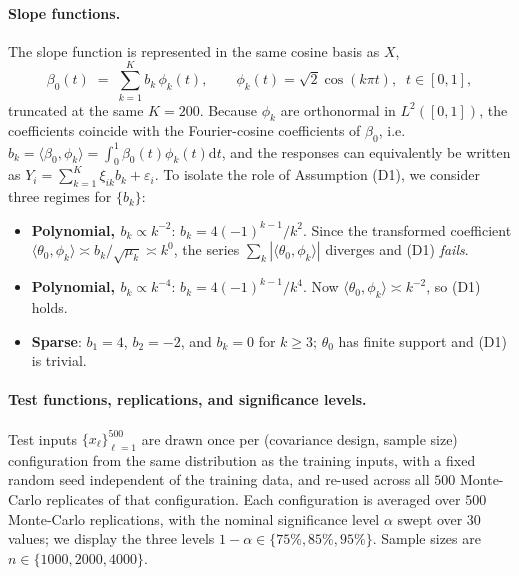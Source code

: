 \documentclass[11pt,a4paper]{article}
\theoremstyle{definition}
\theoremstyle{plain}
\theoremstyle{remark}
\newcommand{\ud}{\mathrm d}
\begin{document}
\paragraph{Slope functions.}
The slope function is represented in the same cosine basis as $X$,
\[
\beta_0(t)\;=\;\sum_{k=1}^{K} b_k\,\phi_k(t),\qquad \phi_k(t)=\sqrt 2\cos(k\pi t),\;\; t\in[0,1],
\]
truncated at the same $K=200$. Because $\phi_k$ are orthonormal in $L^2([0,1])$, the coefficients coincide with the Fourier-cosine coefficients of $\beta_0$, i.e.\ $b_k=\langle\beta_0,\phi_k\rangle=\int_0^1\beta_0(t)\phi_k(t)\ud t$, and the responses can equivalently be written as $Y_i=\sum_{k=1}^{K}\xi_{ik}b_k+\varepsilon_i$. To isolate the role of Assumption (D1), we consider three regimes for $\{b_k\}$:
\begin{itemize}
\item \textbf{Polynomial, $b_k\propto k^{-2}$}: $b_k=4(-1)^{k-1}/k^{2}$. Since the transformed coefficient $\langle\theta_0,\phi_k\rangle\asymp b_k/\sqrt{\mu_k}\asymp k^{0}$, the series $\sum_k|\langle\theta_0,\phi_k\rangle|$ diverges and (D1) \emph{fails}.
\item \textbf{Polynomial, $b_k\propto k^{-4}$}: $b_k=4(-1)^{k-1}/k^{4}$. Now $\langle\theta_0,\phi_k\rangle\asymp k^{-2}$, so (D1) holds.
\item \textbf{Sparse}: $b_1=4$, $b_2=-2$, and $b_k=0$ for $k\geq 3$; $\theta_0$ has finite support and (D1) is trivial.
\end{itemize}

\paragraph{Test functions, replications, and significance levels.}
Test inputs $\{x_\ell\}_{\ell=1}^{500}$ are drawn once per (covariance design, sample size) configuration from the same distribution as the training inputs, with a fixed random seed independent of the training data, and re-used across all $500$ Monte-Carlo replicates of that configuration. Each configuration is averaged over $500$ Monte-Carlo replications, with the nominal significance level $\alpha$ swept over $30$ values; we display the three levels $1-\alpha\in\{75\%,85\%,95\%\}$. Sample sizes are $n\in\{1000,2000,4000\}$.
\end{document}
